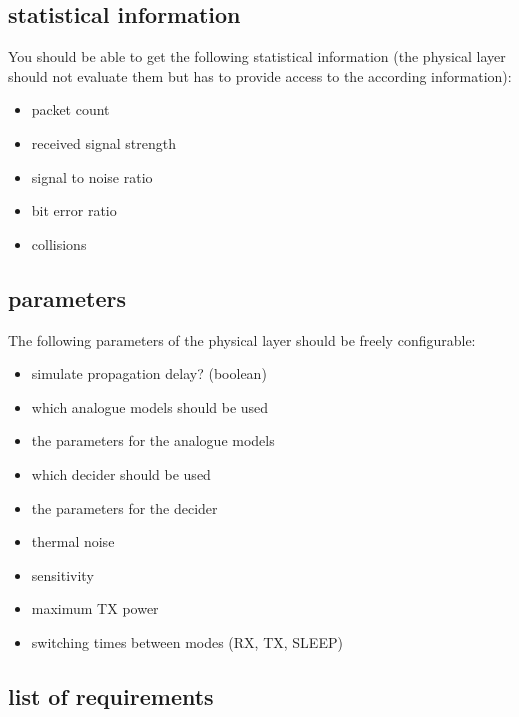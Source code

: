 \subsection{statistical information}

You should be able to get the following statistical information (the physical layer should not evaluate them but has to provide access to the according information):

\begin{itemize}
\item packet count
\item received signal strength
\item signal to noise ratio
\item bit error ratio
\item collisions
\end{itemize}

\subsection{parameters}

The following parameters of the physical layer should be freely configurable:

\begin{itemize}
	\item simulate propagation delay? (boolean)
	\item which analogue models should be used
	\item the parameters for the analogue models
	\item which decider should be used
	\item the parameters for the decider
	\item thermal noise
	\item sensitivity
	\item maximum TX power
	\item switching times between modes (RX, TX, SLEEP)
\end{itemize}

\subsection{list of requirements}

